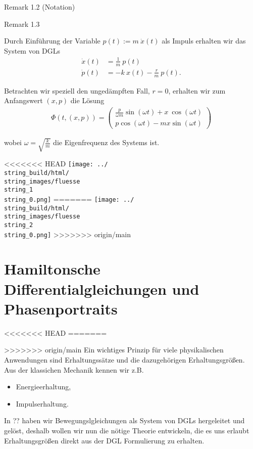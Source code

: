 \documentclass[letterpaper,10pt,english]{jupyterBook}
\begin{document}
\begin{emphBox}{}{}{Remark 1.2 (Notation)}
\begin{emphBox}{}{}{Remark 1.3}
\begin{example}{}{}
\par
Durch Einführung der Variable \(p(t):= m~\dot{x}(t)\) als Impuls erhalten wir das System von DGLs
\begin{align*}
\dot{x}(t) &= \frac{1}{m}~p(t) \\
\dot{p}(t) &= -k~x(t) - \frac{r}{m}~p(t).
\end{align*}
\par
Betrachten wir speziell den ungedämpften Fall, \(r=0\), erhalten wir zum Anfangswert \((x,p)\) die Lösung
\begin{align*}
\Phi(t, (x,p)) = 
\begin{pmatrix}
\frac{p}{\omega m}\sin(\omega t) + x~\cos(\omega t)\\
p \cos(\omega t) - m x \sin(\omega t)
\end{pmatrix}
\end{align*}
\par
wobei \(\omega=\sqrt{\frac{k}{m}}\) die Eigenfrequenz des Systems ist.
\end{example}

<<<<<<< HEAD
\noindent\texttt{[image: ../\\string\_build/html/\\string\_images/fluesse\\string\_1\\string\_0.png]}
=======
\noindent\texttt{[image: ../\\string\_build/html/\\string\_images/fluesse\\string\_2\\string\_0.png]}
>>>>>>> origin/main


\section{Hamiltonsche Differentialgleichungen und Phasenportraits}
\label{\detokenize{ode/hamilton:hamiltonsche-differentialgleichungen-und-phasenportraits}}\label{\detokenize{ode/hamilton::doc}}
<<<<<<< HEAD
=======
\par
>>>>>>> origin/main
Ein wichtiges Prinzip für viele physikalischen Anwendungen sind Erhaltungssätze und die dazugehörigen Erhaltungsgrößen. Aus der klassichen Mechanik kennen wir z.B.
\begin{itemize}
\item {} 
\par
Energieerhaltung,

\item {} 
\par
Impulserhaltung.

\end{itemize}

\par
In ?? haben wir Bewegungslgleichungen als System von DGLs hergeleitet und gelöst, deshalb wollen wir nun die nötige Theorie entwickeln, die es uns erlaubt Erhaltungsgrößen direkt aus der DGL Formulierung zu erhalten.
\label{ode/hamilton:example-0}
\begin{example}{}{}



\end{example}
\end{emphBox}
\end{emphBox}
\end{document}
